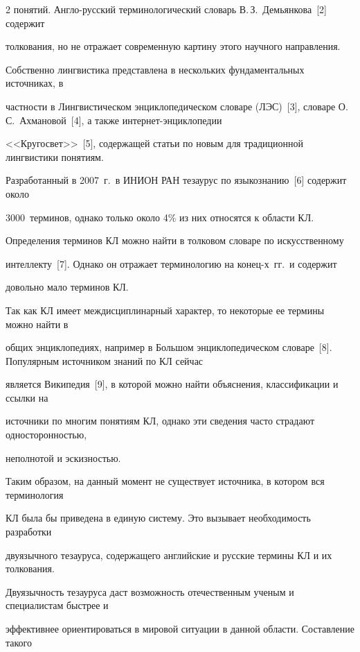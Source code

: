 \begin{multicols}{2}
понятий. Англо-русский терминологический словарь В.\,З.~Демьянкова~[2] содержит 

толкования, но не отражает современную картину этого научного направления. 

  

  Собственно лингвистика представлена в нескольких фундаментальных источниках, в 

част\-ности в Лингвистическом энциклопедическом словаре (ЛЭС)~[3], словаре О.\,С.~Ахмановой~[4], а также интернет-энциклопедии 

<<Кругосвет>>~[5], содержащей статьи по новым для традиционной лингвистики понятиям. 

Разработанный в 2007~г.\ в ИНИОН РАН тезаурус по языкознанию~[6] содержит около 

3000~терминов, однако только около 4\% из них относятся к области КЛ.

  

  Определения терминов КЛ можно найти в толковом словаре по искусственному 

интеллекту~[7]. Однако он отражает терминологию на конец-х~гг.\ и содержит 

довольно мало терминов КЛ.

  

  Так как КЛ имеет междисциплинарный характер, то некоторые ее термины можно найти в 

общих энциклопедиях, например в Большом энциклопедическом словаре~[8]. Популярным источником знаний по КЛ сейчас 

является Википедия~[9], в которой можно найти объяснения, классификации и ссылки на 

источники по многим понятиям КЛ, однако эти сведения часто страдают односто\-рон\-ностью, 

неполнотой и эскизностью.

  

  Таким образом, на данный момент не существует источника, в котором вся терминология 

КЛ была бы приведена в единую систему. Это вызывает необходимость разработки 

двуязычного тезауруса, содержащего английские и русские термины КЛ и их толкования. 

Двуязычность тезауруса даст возможность отечественным ученым и специалистам быстрее и 

эффективнее ориентироваться в мировой ситуации в данной области. Составление такого 


\end{multicols}

